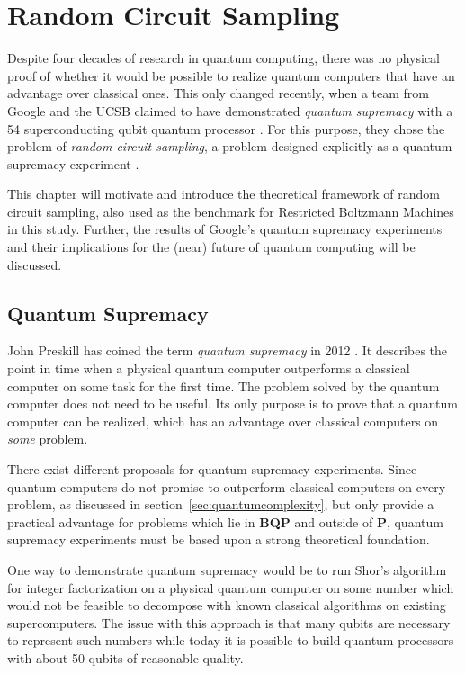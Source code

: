 \chapter{Random Circuit Sampling}

Despite four decades
of research in quantum computing, 
there was no physical proof of whether it would be possible to realize quantum computers
that have an advantage over classical ones. This only changed
recently, when a team from Google and the UCSB claimed to have demonstrated \textit{quantum supremacy}
with a 54 superconducting qubit quantum processor \cite{martines2019supremacy}. For this purpose, they
chose the problem of \textit{random circuit sampling}, a problem designed explicitly
as a quantum supremacy experiment \cite{Boixo2018supremacy}.

This chapter will motivate and introduce the theoretical framework of random circuit
sampling, also used as the benchmark for Restricted Boltzmann Machines in this
study. Further, the results of Google's quantum supremacy experiments and their
implications for the (near) future of quantum computing will be discussed.

\section{Quantum Supremacy}

John Preskill has coined the term \textit{quantum supremacy} in 2012
\cite{preskill2012quantum}. It describes the point in time when a physical quantum computer
outperforms a classical computer on some task for the first time. The problem
solved by the quantum computer does not need to be useful. Its only purpose is
to prove that a quantum computer can be realized, which has an advantage over
classical computers on \textit{some} problem.

There exist different proposals for quantum supremacy
experiments. Since quantum computers do not promise to outperform classical
computers on every problem, as discussed in section~\ref{sec:quantumcomplexity}, but only provide a
practical advantage for problems which lie in \textbf{BQP} and outside of
\textbf{P}, quantum supremacy experiments must be based upon a strong theoretical foundation.

One way to demonstrate quantum supremacy would be to run Shor's
algorithm for integer factorization \cite{shor1997factorisation} on a physical quantum computer on some number which would not be feasible
to decompose with known classical algorithms on existing supercomputers. The issue with this approach is that many
qubits are necessary to represent such numbers while today it is possible to
build quantum processors with about 50 qubits of reasonable quality.

